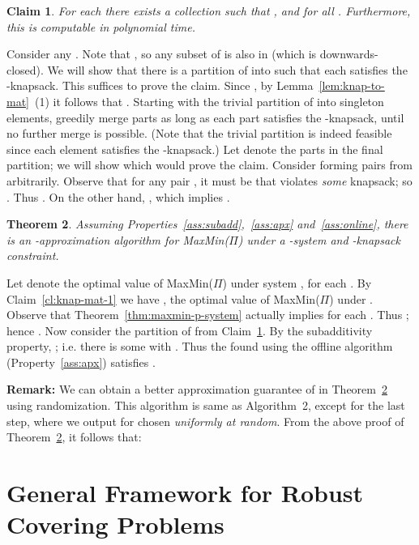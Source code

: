 \documentclass[11pt,letterpaper]{article}
\newtheorem{theorem}{Theorem}[section]
\newtheorem{claim}[theorem]{Claim}
\newenvironment{proof}{

\noindent{\bf Proof:}} {\hfill


}
\def\cov{\ensuremath{\Pi}\xspace}
\def\mmp{{\sf MaxMin(\cov)}\xspace}
\newcounter{note}[section]
\begin{document}
\begin{claim}\label{cl:knap-mat-2}
For each  there exists a collection  such that
, and  for all . Furthermore, this is
computable in polynomial time.
\end{claim}
\begin{proof}
Consider any . Note that , so any subset of  is also in 
(which is downwards-closed). We will show that there is a partition of  into  such
that each  satisfies the -knapsack. This suffices to  prove the claim. Since , by Lemma~\ref{lem:knap-to-mat}~(1) it follows that .
Starting with the trivial partition of  into singleton elements, greedily merge parts as long as each part
satisfies the -knapsack, until no further merge is possible. (Note that the trivial partition is indeed feasible
since each element satisfies the -knapsack.) Let   denote the parts in the final
partition; we will show  which would prove the claim. Consider forming  pairs from
 arbitrarily. Observe that for any pair , it must be that
 violates {\em some} knapsack; so . Thus
. On the other hand, , which implies .
\end{proof}

\begin{theorem}\label{thm:max-min-psystem-knapsack}
Assuming Properties~\ref{ass:subadd},~\ref{ass:apx} and~\ref{ass:online}, there is an -approximation algorithm for \mmp under a -system and -knapsack constraint.
\end{theorem}
\begin{proof}
Let  denote the optimal value of \mmp under  system , for each . By
Claim~\ref{cl:knap-mat-1} we have , the optimal value of \mmp under . Observe that
Theorem~\ref{thm:maxmin-p-system} actually implies  for each .
Thus ; hence . Now
consider the partition  of  from Claim~\ref{cl:knap-mat-2}. By the subadditivity
property, ; i.e. there is some  with
. Thus the  found using the offline algorithm
(Property~\ref{ass:apx}) satisfies .
\end{proof}

{\bf Remark:} We can obtain a better approximation guarantee of  in
Theorem~\ref{thm:max-min-psystem-knapsack} using randomization. This algorithm is same as Algorithm~2, except for the
last step, where we output  for  chosen {\em uniformly at random}. From the above proof
of Theorem~\ref{thm:max-min-psystem-knapsack}, it follows that:


\section{General Framework for Robust Covering Problems} \label{sec:gen-sets}
\newcommand{\mapx}{\alpha_{\sf mm}}
\end{document}
